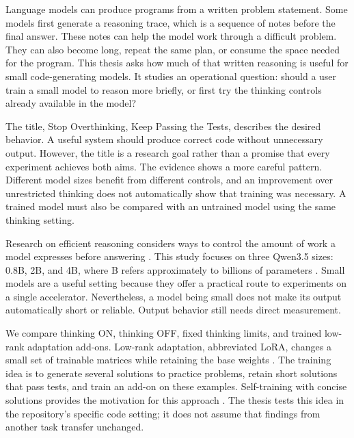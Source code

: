 \documentclass[11pt,letterpaper]{article}
\begin{document}
Language models can produce programs from a written problem statement. Some models first generate a reasoning trace, which is a sequence of notes before the final answer. These notes can help the model work through a difficult problem. They can also become long, repeat the same plan, or consume the space needed for the program. This thesis asks how much of that written reasoning is useful for small code-generating models. It studies an operational question: should a user train a small model to reason more briefly, or first try the thinking controls already available in the model?\par

The title, Stop Overthinking, Keep Passing the Tests, describes the desired behavior. A useful system should produce correct code without unnecessary output. However, the title is a research goal rather than a promise that every experiment achieves both aims. The evidence shows a more careful pattern. Different model sizes benefit from different controls, and an improvement over unrestricted thinking does not automatically show that training was necessary. A trained model must also be compared with an untrained model using the same thinking setting.\par

Research on efficient reasoning considers ways to control the amount of work a model expresses before answering \cite{survey}. This study focuses on three Qwen3.5 sizes: 0.8B, 2B, and 4B, where B refers approximately to billions of parameters \cite{q08,q2,q4}. Small models are a useful setting because they offer a practical route to experiments on a single accelerator. Nevertheless, a model being small does not make its output automatically short or reliable. Output behavior still needs direct measurement.\par

We compare thinking ON, thinking OFF, fixed thinking limits, and trained low-rank adaptation add-ons. Low-rank adaptation, abbreviated LoRA, changes a small set of trainable matrices while retaining the base weights \cite{lora}. The training idea is to generate several solutions to practice problems, retain short solutions that pass tests, and train an add-on on these examples. Self-training with concise solutions provides the motivation for this approach \cite{selftrain}. The thesis tests this idea in the repository's specific code setting; it does not assume that findings from another task transfer unchanged.\par
\end{document}
